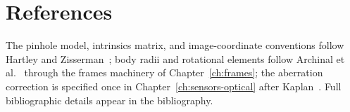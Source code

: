 \section{References}
\label{sec:camera:references}

The pinhole model, intrinsics matrix, and image-coordinate conventions
follow Hartley and Zisserman~\cite{hartley2004}; body radii and
rotational elements follow Archinal et al.~\cite{archinal2018} through
the frames machinery of Chapter~\ref{ch:frames}; the aberration
correction is specified once in Chapter~\ref{ch:sensors-optical} after
Kaplan~\cite{kaplan2005}. Full bibliographic details appear in the
bibliography.
